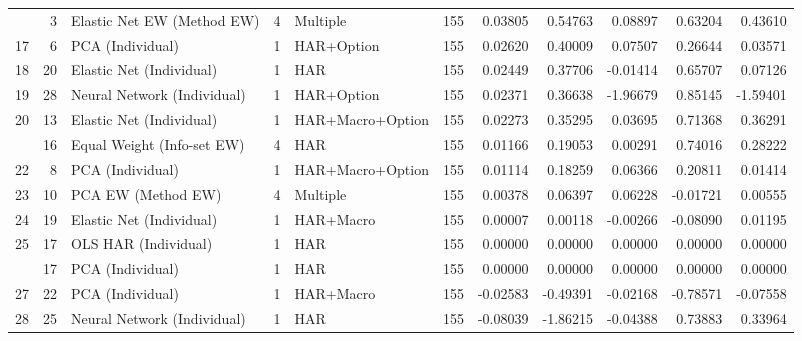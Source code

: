 \begin{tabular}{rrlrlrrrrrr}
\addlinespace
16 & 3 & Elastic Net EW (Method EW) & 4 & Multiple & 155 & 0.03805 & 0.54763 & 0.08897 & 0.63204 & 0.43610\\
17 & 6 & PCA (Individual) & 1 & HAR+Option & 155 & 0.02620 & 0.40009 & 0.07507 & 0.26644 & 0.03571\\
18 & 20 & Elastic Net (Individual) & 1 & HAR & 155 & 0.02449 & 0.37706 & -0.01414 & 0.65707 & 0.07126\\
19 & 28 & Neural Network (Individual) & 1 & HAR+Option & 155 & 0.02371 & 0.36638 & -1.96679 & 0.85145 & -1.59401\\
20 & 13 & Elastic Net (Individual) & 1 & HAR+Macro+Option & 155 & 0.02273 & 0.35295 & 0.03695 & 0.71368 & 0.36291\\
\addlinespace
21 & 16 & Equal Weight (Info-set EW) & 4 & HAR & 155 & 0.01166 & 0.19053 & 0.00291 & 0.74016 & 0.28222\\
22 & 8 & PCA (Individual) & 1 & HAR+Macro+Option & 155 & 0.01114 & 0.18259 & 0.06366 & 0.20811 & 0.01414\\
23 & 10 & PCA EW (Method EW) & 4 & Multiple & 155 & 0.00378 & 0.06397 & 0.06228 & -0.01721 & 0.00555\\
24 & 19 & Elastic Net (Individual) & 1 & HAR+Macro & 155 & 0.00007 & 0.00118 & -0.00266 & -0.08090 & 0.01195\\
25 & 17 & OLS HAR (Individual) & 1 & HAR & 155 & 0.00000 & 0.00000 & 0.00000 & 0.00000 & 0.00000\\
\addlinespace
25 & 17 & PCA (Individual) & 1 & HAR & 155 & 0.00000 & 0.00000 & 0.00000 & 0.00000 & 0.00000\\
27 & 22 & PCA (Individual) & 1 & HAR+Macro & 155 & -0.02583 & -0.49391 & -0.02168 & -0.78571 & -0.07558\\
28 & 25 & Neural Network (Individual) & 1 & HAR & 155 & -0.08039 & -1.86215 & -0.04388 & 0.73883 & 0.33964\\
\bottomrule
\end{tabular}
